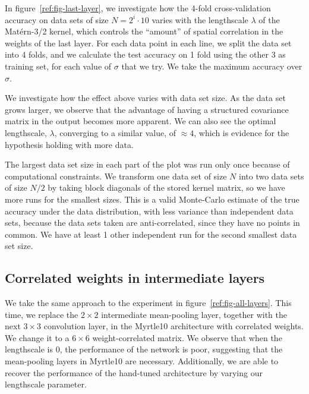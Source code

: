 \documentclass{article}
\theoremstyle{definition}
\begin{document}
In figure~\ref{ref:fig-last-layer}, we investigate how the 4-fold cross-validation accuracy on data sets of size $N=2^i \cdot 10$ varies with the lengthscale $\lambda$ of the Matérn-3/2 kernel, which controls the ``amount'' of spatial correlation in the weights of the last layer. For each data point in each line, we split the data set into 4 folds, and we calculate the test accuracy on 1 fold using the other 3 as training set, for each value of $\sigma$ that we try. We take the maximum accuracy over $\sigma$.

We investigate how the effect above varies with data set size. As the data set grows larger, we observe that the advantage of having a structured covariance matrix in the output becomes more apparent. We can also see the optimal lengthscale, $\lambda$, converging to a similar value, of $\approx 4$, which is evidence for the hypothesis holding with more data. 

The largest data set size in each part of the plot was run only once because of computational constraints. We transform one data set of size $N$ into two data sets of size $N/2$ by taking block diagonals of the stored kernel matrix, so we have more runs for the smallest sizes. This is a valid Monte-Carlo estimate of the true accuracy under the data distribution, with less variance than independent data sets, because the data sets taken are anti-correlated, since they have no points in common. We have at least 1 other independent run for the second smallest data set size.

\subsection{Correlated weights in intermediate layers}
\vspace{-0.3cm}
We take the same approach to the experiment in figure~\ref{ref:fig-all-layers}. This time, we replace the $2\times 2$ intermediate mean-pooling layer, together with the next $3\times 3$ convolution layer, in the Myrtle10 architecture with correlated weights. We change it to a $6 \times 6$ weight-correlated matrix. We observe that when the lengthscale is 0, the performance of the network is poor, suggesting that the mean-pooling layers in Myrtle10 are necessary. Additionally, we are able to recover the performance of the hand-tuned architecture by varying our lengthscale parameter.
\end{document}
